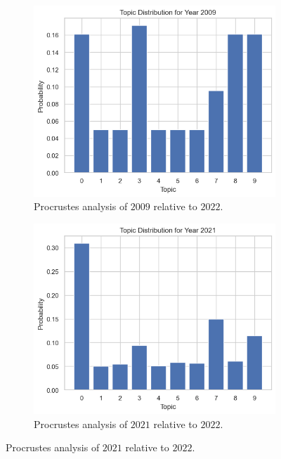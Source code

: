 \newpage
\begin{figure}[h!]
  \centering
  \begin{subfigure}[b]{0.45\textwidth}
    \includegraphics[width=\textwidth]{figures/procrustes/topics-2009.png}
    \caption{Procrustes analysis of $2009$ relative to $2022$.}
    \label{fig:procrustes-topics-2009}
  \end{subfigure}
  \hfill
  \begin{subfigure}[b]{0.45\textwidth}
    \includegraphics[width=\textwidth]{figures/procrustes/topics-2021.png}
    \caption{Procrustes analysis of $2021$ relative to $2022$.}

\end{subfigure}
\end{figure}
